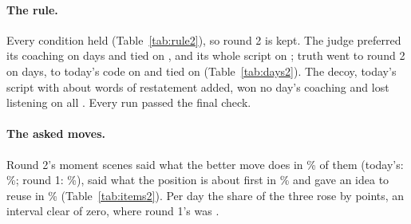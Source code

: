 \documentclass[11pt]{article}
\begin{document}
\begin{table}[h]
\centering
\small\ScenesTable
\caption{Moment scenes that say what the better move does, by whether the audit reads the scene as
teaching a better move or as showing only his move, pooled over the \Days{} days, with the number of
scenes in brackets. In round 2 every scene named a better move, so the audit read none as showing
only his move.}
\label{tab:scenes}
\end{table}

\paragraph{The rule.} Every condition held (Table~\ref{tab:rule2}), so round 2 is kept. The judge
preferred its coaching on \TwoCoachingWins{} days and tied on \TwoCoachingTies, and its whole script
on \TwoOverallWins; truth went to round 2 on \TwoTruthWins{} days, to today's code on
\TwoTruthLosses{} and tied on \TwoTruthTies{} (Table~\ref{tab:days2}). The decoy, today's script with
about \TwoDecoyAdded{} words of restatement added, won no day's coaching and lost listening on all
\Days. Every run passed the final check.

\begin{table}[h]
\centering
\small\TwoRuleTable
\caption{Round 2 against the rule fixed before round 1, over the \Days{} days unless a row says
otherwise. The judge's rows are the mean verdict from round 2's side ($+1$ round 2, $-1$ today's
code), the audit's rows per script, round 2 minus today's code.}
\label{tab:rule2}
\end{table}

\paragraph{The asked moves.} Round 2's moment scenes said what the better move does in
\TwoPurposeNamed\% of them (today's: \BasePurposeNamed\%; round 1: \CandPurposeNamed\%), said what the
position is about first in \TwoAboutFirst\% and gave an idea to reuse in \TwoTakeaway\%
(Table~\ref{tab:items2}). Per day the share of the three rose by \TwoAskedDiff{} points, an
interval clear of zero, where round 1's was \AskedDiff.
\end{document}
